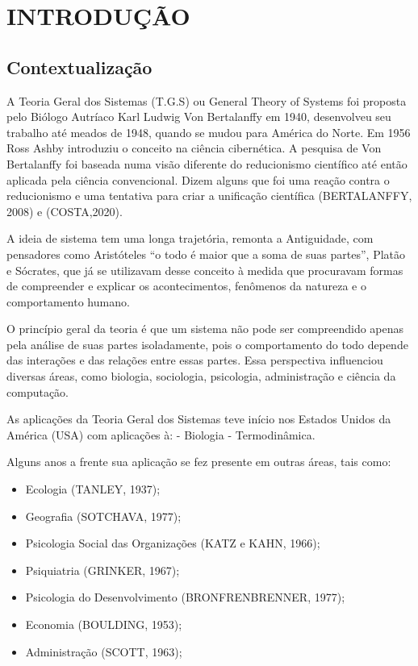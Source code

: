 \section{INTRODUÇÃO}
\subsection{Contextualização}

A Teoria Geral dos Sistemas (T.G.S) ou General Theory of Systems foi proposta pelo Biólogo Autríaco Karl Ludwig Von Bertalanffy em 1940, desenvolveu seu trabalho até meados de 1948, quando se mudou para América do Norte. Em 1956 Ross Ashby introduziu o conceito na ciência cibernética. A pesquisa de Von Bertalanffy foi baseada numa visão diferente do reducionismo científico até então aplicada pela ciência convencional. Dizem alguns que foi uma reação contra o reducionismo e uma tentativa para criar a unificação científica (BERTALANFFY, 2008) e (COSTA,2020).\vskip0.3cm

A ideia de sistema tem uma longa trajetória, remonta a Antiguidade, com pensadores como Aristóteles “o todo é maior que a soma de suas partes”, Platão e Sócrates, que já se utilizavam desse conceito à medida que procuravam formas de compreender e explicar os acontecimentos, fenômenos da natureza e o comportamento humano.\vskip0.3cm

O princípio geral da teoria é que um sistema não pode ser compreendido apenas pela análise de suas partes isoladamente, pois o comportamento do todo depende das interações e das relações entre essas partes. Essa perspectiva influenciou diversas áreas, como biologia, sociologia, psicologia, administração e ciência da computação.\vskip0.3cm



As aplicações da Teoria Geral dos Sistemas teve início nos Estados Unidos da América (USA) com aplicações à: - Biologia - Termodinâmica.\vskip0.3cm

Alguns anos a frente sua aplicação se fez presente em outras áreas, tais como:

\begin{itemize}
    \item Ecologia (TANLEY, 1937);
    \item Geografia (SOTCHAVA, 1977);
    \item Psicologia Social das Organizações (KATZ e KAHN, 1966);
    \item Psiquiatria (GRINKER, 1967);
    \item Psicologia do Desenvolvimento (BRONFRENBRENNER, 1977);
    \item Economia (BOULDING, 1953);
    \item Administração (SCOTT, 1963);
\end{itemize}

